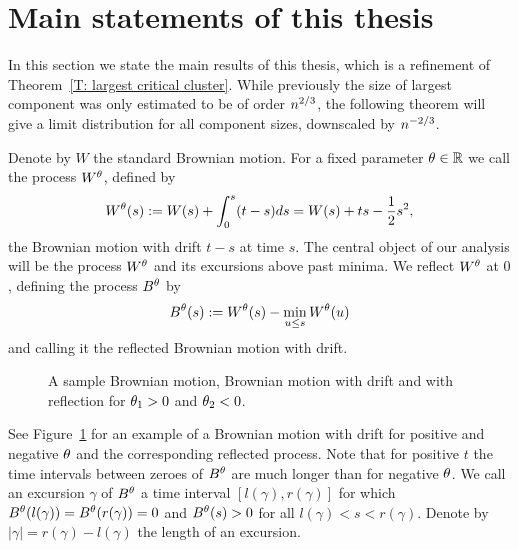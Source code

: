 \section{Main statements of this thesis}

In this section we state the main results of this thesis,
which is a refinement of Theorem~\ref{T: largest critical cluster}.
While previously the size of largest component was only estimated to be of order $n^{2 / 3}$,
the following theorem will give a limit distribution for all component sizes, downscaled by $n^{-2 / 3}$.

Denote by $W$ the standard Brownian motion. 
For a fixed parameter $\theta \in \mathbb{R}$ we call the process $W^{\theta}$, defined by
\begin{equation}
	W^{\theta}(s) := W(s) + \int_{0}^{s}(t-s)ds = W(s) + ts - \frac{1}{2}s^2,
\end{equation}
the Brownian motion with drift $t-s$ at time $s$.
The central object of our analysis will be the process $W^{\theta}$ and its excursions above past minima.
We reflect $W^{\theta}$ at $0$, defining the process $B^{\theta}$ by
\begin{equation}
	B^{\theta}(s) := W^{\theta}(s) - \min_{u \leq s}W^{\theta}(u)
\end{equation}
and calling it the reflected Brownian motion with drift.

\begin{figure}%
	\centering
	\subfloat[$W(s)$]{}%
	\quad
	\subfloat[$W^{\pp_1}(s)$]{}%
	\quad
	\subfloat[$B^{\pp_1}(s)$]{}%
	\quad
	\subfloat[$W^{\pp_2}(s)$]{}%
	\quad
	\subfloat[$B^{\pp_2}(s)$]{}%
	\caption{A sample Brownian motion, Brownian motion with drift and with reflection for $\theta_1>0$ and $\theta_2<0$.}%
	\label{F: BM}%
\end{figure}

See Figure~\ref{F: BM} for an example of a Brownian motion with drift for positive and negative $\theta$ and the corresponding reflected process.
Note that for positive $t$ the time intervals between zeroes of $B^{\theta}$ are much longer than for negative $\theta$.
We call an excursion $\gamma$ of $B^{\theta}$ a time interval $[l(\gamma), r(\gamma)]$ for which $B^{\theta}(l(\gamma)) = B^{\theta}(r(\gamma)) = 0$
and $B^{\theta}(s) > 0$ for all $l(\gamma) < s < r(\gamma)$.
Denote by $|\gamma| = r(\gamma) - l(\gamma)$ the length of an excursion.

